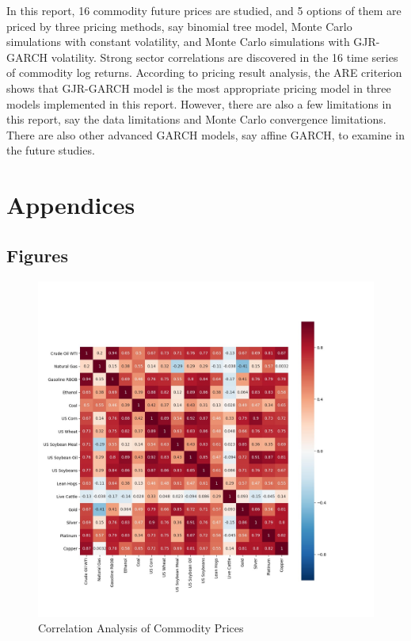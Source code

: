 \documentclass[10pt, a4paper, twocolumn]{article} %
\begin{document}
In this report, 16 commodity future prices are studied, and 5 options of them are priced by three pricing methods, say binomial tree model, Monte Carlo simulations with constant volatility, and Monte Carlo simulations with GJR-GARCH volatility. Strong sector correlations are discovered in the 16 time series of commodity log returns. According to pricing result analysis, the ARE criterion shows that GJR-GARCH model is the most appropriate pricing model in three models implemented in this report. However, there are also a few limitations in this report, say the data limitations and Monte Carlo convergence limitations. There are also other advanced GARCH models, say affine GARCH, to examine in the future studies.

\printbibliography[title={References}] %

\onecolumn
\newpage
\section{Appendices}
\subsection{Figures}
\begin{figure}[!ht]
	\includegraphics[width=\linewidth]{priceCorrelation.jpg} %
	\caption{Correlation Analysis of Commodity Prices} %
	\label{priceCorrelation} %
\end{figure}
\end{document}

